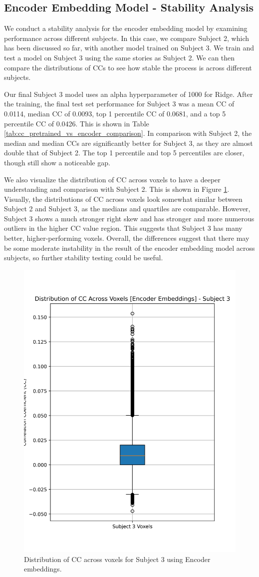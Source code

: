 \documentclass[10pt,letterpaper]{article}
\begin{document}
\subsection{Encoder Embedding Model - Stability Analysis}
We conduct a stability analysis for the encoder embedding model by examining performance across different subjects. In this case, we compare Subject 2, which has been discussed so far, with another model trained on Subject 3. We train and test a model on Subject 3 using the same stories as Subject 2. We can then compare the distributions of CCs to see how stable the process is across different subjects.

Our final Subject 3 model uses an alpha hyperparameter of 1000 for Ridge. After the training, the final test set performance for Subject 3 was a mean CC of 0.0114, median CC of 0.0093, top 1 percentile CC of 0.0681, and a top 5 percentile CC of 0.0426. This is shown in Table \ref{tab:cc_pretrained_vs_encoder_comparison}. In comparison with Subject 2, the median and median CCs are significantly better for Subject 3, as they are almost double that of Subject 2. The top 1 percentile and top 5 percentiles are closer, though still show a noticeable gap.

We also visualize the distribution of CC across voxels to have a deeper understanding and comparison with Subject 2. This is shown in Figure \ref{fig:cc_dist_encoder_subj_3}. Visually, the distributions of CC across voxels look somewhat similar between Subject 2 and Subject 3, as the medians and quartiles are comparable. However, Subject 3 shows a much stronger right skew and has stronger and more numerous outliers in the higher CC value region. This suggests that Subject 3 has many better, higher-performing voxels. Overall, the differences suggest that there may be some moderate instability in the result of the encoder embedding model across subjects, so further stability testing could be useful.

\begin{figure}[ht]
    \centering
    \includegraphics[width=0.5\linewidth]{figs/encoder_subj3_cc_dist.png}
    \caption{Distribution of CC across voxels for Subject 3 using Encoder embeddings.}
    \label{fig:cc_dist_encoder_subj_3}
\end{figure}
\end{document}

